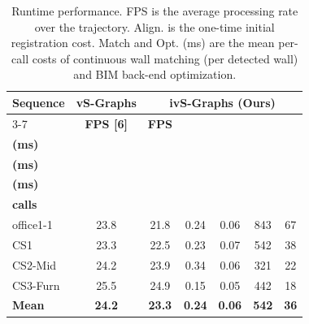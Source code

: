 \begin{table}[b]
    \centering
    \caption{Runtime performance. FPS is the average processing rate over the trajectory. Align. is the one-time initial registration cost. Match and Opt. (ms) are the mean per-call costs of continuous wall matching (per detected wall) and BIM back-end optimization.}
    \label{tab:runtime}
    \setlength{\tabcolsep}{3pt}
    \begin{tabular}{l|c|ccccc}
    \toprule
    \multirow{2}{*}{\textbf{Sequence}} & \textbf{vS-Graphs} & \multicolumn{5}{c}{\textbf{ivS-Graphs (Ours)}} \\
    \cmidrule(lr){3-7}
    & \textbf{FPS [6]} & \textbf{FPS} & \shortstack{\textbf{Align.}\\\textbf{(ms)}} & \shortstack{\textbf{Match}\\\textbf{(ms)}} & \shortstack{\textbf{Opt.}\\\textbf{(ms)}} & \shortstack{\textbf{Opt.}\\\textbf{calls}} \\
    \midrule
    office1-1   & 23.8 & 21.8 & 0.24 & 0.06 & 843 & 67 \\
    CS1         & 23.3 & 22.5 & 0.23 & 0.07 & 542 & 38 \\
    CS2-Mid     & 24.2 & 23.9 & 0.34 & 0.06 & 321 & 22 \\
    CS3-Furn    & 25.5 & 24.9 & 0.15 & 0.05 & 442 & 18 \\
    \midrule
    \textbf{Mean} & \textbf{24.2} & \textbf{23.3} & \textbf{0.24} & \textbf{0.06} & \textbf{542} & \textbf{36} \\
    \bottomrule
    \end{tabular}
\end{table}


